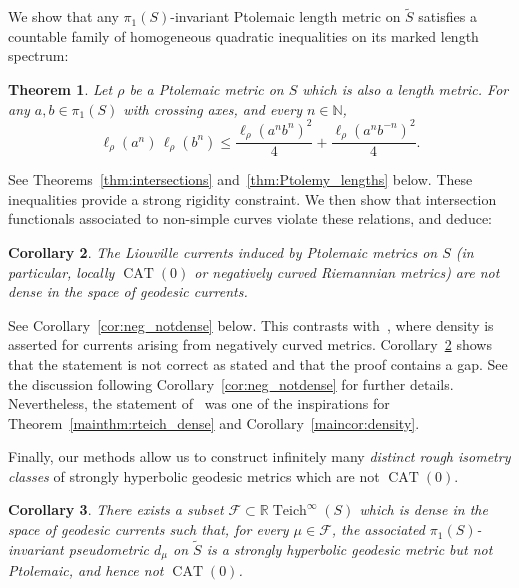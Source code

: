 \documentclass[12pt]{amsart}
\numberwithin{equation}{section}
\numberwithin{figure}{section}
\newtheorem{mainthm}{Theorem}
\newtheorem{maincor}[mainthm]{Corollary}
\theoremstyle{definition}
\theoremstyle{plain}
\DeclareMathOperator{\Teich}{Teich}
\DeclareMathOperator{\CAT}{CAT}
\newcommand*{\wt}[1]{\widetilde{#1}}
\begin{document}
We show that any $\pi_1(S)$-invariant Ptolemaic length metric on $\widetilde{S}$ satisfies a countable family of homogeneous quadratic inequalities on its marked length spectrum:

\begin{mainthm}
Let $\rho$ be a Ptolemaic metric on $S$ which is also a length metric. 
For any $a,b \in \pi_1(S)$ with crossing axes, and every $n \in \mathbb{N}$,
\[
\ell_{\rho}(a^n)\,\ell_{\rho}(b^n) 
\leq 
\frac{\ell_{\rho}(a^n b^n)^2}{4}
+
\frac{\ell_{\rho}(a^n b^{-n})^2}{4}.
\]
\label{mainthm:Ptolemy_lengths}
\end{mainthm}

See Theorems~\ref{thm:intersections} and~\ref{thm:Ptolemy_lengths} below.
These inequalities provide a strong rigidity constraint. 
We then show that intersection functionals associated to non-simple curves violate these relations, and deduce:

\begin{maincor}
The Liouville currents induced by Ptolemaic metrics on $S$ (in particular, locally $\CAT(0)$ or negatively curved Riemannian metrics) are not dense in the space of geodesic currents.
\label{maincor:negnotdense}
\end{maincor}

See Corollary~\ref{cor:neg_notdense} below. This contrasts with~\cite[Lemma~2.8]{Ham99:Cocycles}, where density is asserted for currents arising from negatively curved metrics. Corollary~\ref{maincor:negnotdense} shows that the statement is not correct as stated and that the proof contains a gap. See the discussion following Corollary~\ref{cor:neg_notdense} for further details. Nevertheless, the statement of~\cite[Lemma~2.8]{Ham99:Cocycles} was one of the inspirations for Theorem~\ref{mainthm:rteich_dense} and Corollary~\ref{maincor:density}.

Finally, our methods allow us to construct infinitely many \emph{distinct rough isometry classes} of strongly hyperbolic geodesic metrics which are not $\CAT(0)$.

\begin{maincor}
There exists a subset $\mathcal F \subset \mathbb{R}\Teich^\infty(S)$ which is dense in the space of geodesic currents such that, for every $\mu\in\mathcal F$, the associated $\pi_1(S)$-invariant pseudometric $d_\mu$ on $\wt S$ is a strongly hyperbolic geodesic metric but not Ptolemaic, and hence not $\CAT(0)$.
\label{maincor:sh_not_cat0}
\end{maincor}
\end{document}
